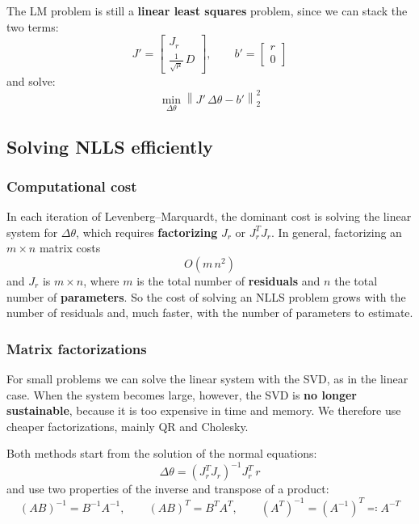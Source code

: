 The LM problem is still a \textbf{linear least squares} problem, since we can stack the two terms:
\[
J' = \begin{bmatrix} J_r \\ \frac{1}{\sqrt{\mu}}\, D \end{bmatrix}, \qquad b' = \begin{bmatrix} r \\ 0 \end{bmatrix}
\]
and solve:
\[
\min_{\Delta\theta} \left\| J'\, \Delta\theta - b' \right\|_2^2
\]

\subsection{Solving NLLS efficiently}
\subsubsection{Computational cost}
In each iteration of Levenberg--Marquardt, the dominant cost is solving the linear system for $\Delta\theta$, which requires \textbf{factorizing} $J_r$ or $J_r^T J_r$.
In general, factorizing an $m \times n$ matrix costs
\[
O(m\, n^2)
\]
and $J_r$ is $m \times n$, where $m$ is the total number of \textbf{residuals} and $n$ the total number of \textbf{parameters}.
So the cost of solving an NLLS problem grows with the number of residuals and, much faster, with the number of parameters to estimate.

\subsubsection{Matrix factorizations}
For small problems we can solve the linear system with the SVD, as in the linear case. When the system becomes large, however, the SVD is \textbf{no longer sustainable}, because it is too expensive in time and memory. We therefore use cheaper factorizations, mainly QR and Cholesky.

Both methods start from the solution of the normal equations:
\[
\Delta\theta = (J_r^T J_r)^{-1} J_r^T\, r
\]
and use two properties of the inverse and transpose of a product:
\[
(AB)^{-1} = B^{-1}A^{-1}, \qquad (AB)^T = B^T A^T, \qquad (A^T)^{-1} = (A^{-1})^T \eqqcolon A^{-T}
\]


